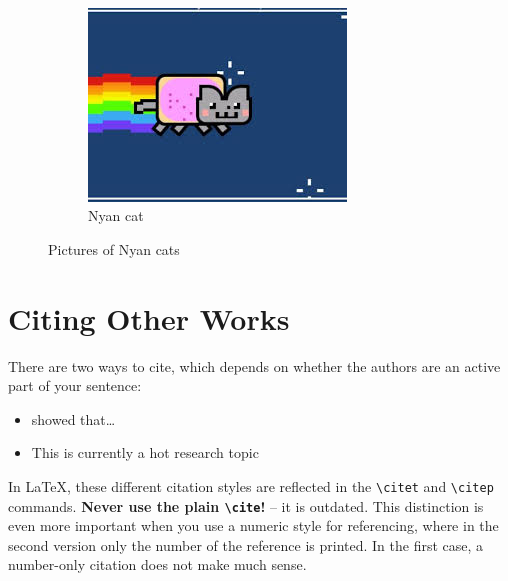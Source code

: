 \documentclass[../{{cookiecutter.project_slug}}.tex]{subfiles}
\begin{document}
\begin{figure}
        ~ %
        \begin{subfigure}[b]{0.3\textwidth}
            \includegraphics[width=\textwidth]{images/cat.jpeg}
            \caption{Nyan cat}
            \label{fig:cat3}  
        \end{subfigure}
        \caption[Nyan cats]{Pictures of Nyan cats}\label{fig:cats}
    \end{figure}



    \section{Citing Other Works}
    There are two ways to cite, which depends on whether the authors are an
    active part of your sentence:
    \begin{itemize}[noitemsep]
        \item \citet{muster} showed that\ldots{}
        \item This is currently a hot research topic \citep{muster}
    \end{itemize}
    In  \LaTeX{}, these  different  citation styles  are  reflected in  the
    \texttt{\textbackslash citet}  and  \texttt{\textbackslash citep}  commands. \textbf{Never  use  the  plain
    \texttt{\textbackslash cite}!} -- it is outdated.
    This distinction  is even more important  when you use a  numeric style
    for referencing, where in the second version only the number of the 
    reference is printed.   In the first case, a  number-only citation does
    not make much sense.
\end{document}
